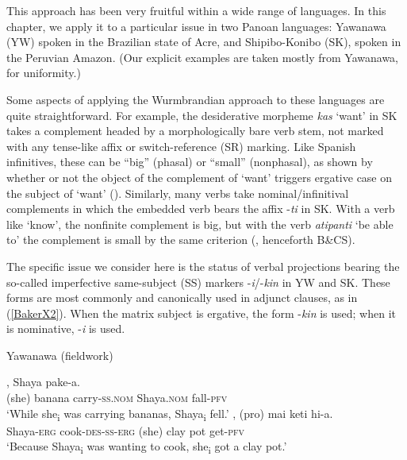 \documentclass[output=paper]{langscibook}
\begin{document}
This approach has been very fruitful within a wide range of languages. In this chapter, we apply it to a particular issue in two Panoan languages: Yawanawa (YW) spoken in the Brazilian state of Acre, and Shipibo-Konibo (SK), spoken in the Peruvian Amazon. (Our explicit examples are taken mostly from Yawanawa, for uniformity.)

Some aspects of applying the Wurmbrandian approach to these languages are quite straightforward. For example, the desiderative morpheme \textit{kas} `want’ in SK takes a complement headed by a morphologically bare verb stem, not marked with any tense-like affix or switch-ref\-er\-ence (SR) marking. Like Spanish infinitives, these can be “big” (phasal) or “small” (nonphasal), as shown by whether or not the object of the complement of `want’ triggers ergative case on the subject of `want’ (\citealt[371--376]{baker2014dependent}). Similarly, many verbs take nominal\slash infinitival complements in which the embedded verb bears the affix -\textit{ti} in SK. With a verb like `know’, the nonfinite complement is big, but with the verb \textit{atipanti} `be able to’ the complement is small by the same criterion (\citealt[17]{baker2020agree}, henceforth B\&CS).

The specific issue we consider here is the status of verbal projections bearing the so-called imperfective same-subject (SS) markers -\textit{i}/-\textit{kin} in YW and SK. These forms are most commonly and canonically used in adjunct clauses, as in (\ref{BakerX2}). When the matrix subject is ergative, the form -\textit{kin} is used; when it is nominative, -\textit{i} is used.\largerpage[-1]

\begin{exe}
    \ex Yawanawa (fieldwork) \label{BakerX2}
	    \begin{xlist}
			\ex \label{BakerX2a}
			, Shaya pake-a.\\
			     (she) banana carry-\textsc{ss.nom} Shaya.\textsc{nom} fall-\textsc{pfv}\\
			    \glt `While she\textsubscript{i} was carrying bananas, Shaya\textsubscript{i} fell.'
			\ex \label{BakerX2b}
			, (pro) mai  keti  hi-a.\\
    			 Shaya-\textsc{erg} cook-\textsc{des-ss-erg} (she) clay pot get-\textsc{pfv}\\
			    \glt `Because Shaya\textsubscript{i} was wanting to cook, she\textsubscript{i} got a clay pot.'
		\end{xlist}
\end{exe}
\end{document}

